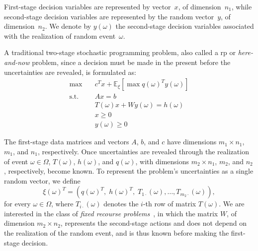 First-stage decision variables are represented by vector~$x$, of
dimension~$n_{1}$, while second-stage decision variables are represented by the
random vector~$y$, of dimension~$n_{2}$. We denote by $y(\omega)$ the
second-stage decision variables associated with the realization of random
event~$\omega$.

A traditional two-stage stochastic programming problem, also called a \gls{rp}
or \emph{here-and-now} problem, since a decision must be made in the present
before the uncertainties are revealed, is formulated as:
\begin{align}
	\max \quad        & c^{T} x + \mathbb{E}_{\xi} \left[ \max q(\omega)^{T} y(\omega) \right] \nonumber \\
	\text{s.t.} \quad & A x = b \nonumber                                                                \\
	                  & T(\omega)x + W y(\omega) = h(\omega) \nonumber                                   \\
	                  & x \geq 0 \nonumber                                                               \\
	                  & y(\omega) \geq 0
	\label{eq:rp}
\end{align}

The first-stage data matrices and vectors $A$, $b$, and $c$ have dimensions
$m_{1} \times n_{1}$, $m_{1}$, and $n_{1}$, respectively. Once uncertainties are
revealed through the realization of event $\omega \in \Omega$, $T(\omega)$,
$h(\omega)$, and $q(\omega)$, with dimensions $m_{2} \times n_{1}$, $m_{2}$, and
$n_{2}$, respectively, become known. To represent the problem's uncertainties as
a single random vector, we define
\[
	\xi(\omega)^{T} = \left(q(\omega)^{T}, \; h(\omega)^{T}, \; T_{1\cdot}(\omega), \ldots, T_{m_{2}\cdot}(\omega) \right),
\]
for every $\omega \in \Omega$, where $T_{i\cdot}(\omega)$ denotes the $i$-th row
of matrix $T(\omega)$. We are interested in the class of \emph{fixed recourse
	problems}~\cite{birge:2011}, in which the matrix $W$, of dimension $m_{2}
	\times n_{2}$, represents the second-stage actions and does not depend on the
realization of the random event, and is thus known before making the first-stage
decision.

